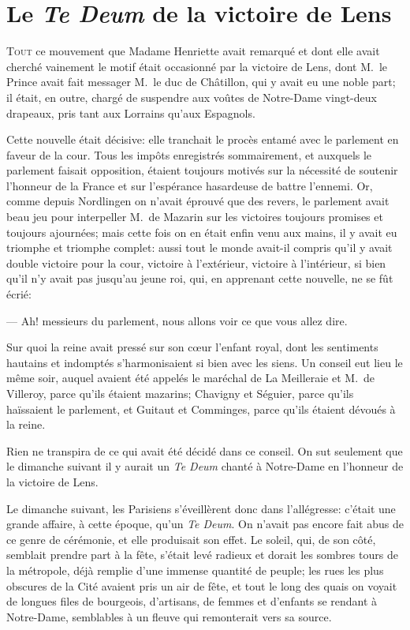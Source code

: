 \chapter{Le \emph{Te Deum} de la victoire de Lens}

\lettrine{T}{out} ce mouvement que Madame Henriette avait remarqué et dont elle avait cherché vainement le motif était occasionné par la victoire de Lens, dont M.~le Prince avait fait messager M.~le duc de Châtillon, qui y avait eu une noble part; il était, en outre, chargé de suspendre aux voûtes de Notre-Dame vingt-deux drapeaux, pris tant aux Lorrains qu'aux Espagnols.

Cette nouvelle était décisive: elle tranchait le procès entamé avec le parlement en faveur de la cour. Tous les impôts enregistrés sommairement, et auxquels le parlement faisait opposition, étaient toujours motivés sur la nécessité de soutenir l'honneur de la France et sur l'espérance hasardeuse de battre l'ennemi. Or, comme depuis Nordlingen on n'avait éprouvé que des revers, le parlement avait beau jeu pour interpeller M.~de Mazarin sur les victoires toujours promises et toujours ajournées; mais cette fois on en était enfin venu aux mains, il y avait eu triomphe et triomphe complet: aussi tout le monde avait-il compris qu'il y avait double victoire pour la cour, victoire à l'extérieur, victoire à l'intérieur, si bien qu'il n'y avait pas jusqu'au jeune roi, qui, en apprenant cette nouvelle, ne se fût écrié:

— Ah! messieurs du parlement, nous allons voir ce que vous allez dire.

Sur quoi la reine avait pressé sur son cœur l'enfant royal, dont les sentiments hautains et indomptés s'harmonisaient si bien avec les siens. Un conseil eut lieu le même soir, auquel avaient été appelés le maréchal de La Meilleraie et M.~de Villeroy, parce qu'ils étaient mazarins; Chavigny et Séguier, parce qu'ils haïssaient le parlement, et Guitaut et Comminges, parce qu'ils étaient dévoués à la reine.

Rien ne transpira de ce qui avait été décidé dans ce conseil. On sut seulement que le dimanche suivant il y aurait un \textit{Te Deum} chanté à Notre-Dame en l'honneur de la victoire de Lens.

Le dimanche suivant, les Parisiens s'éveillèrent donc dans l'allégresse: c'était une grande affaire, à cette époque, qu'un \textit{Te Deum}. On n'avait pas encore fait abus de ce genre de cérémonie, et elle produisait son effet. Le soleil, qui, de son côté, semblait prendre part à la fête, s'était levé radieux et dorait les sombres tours de la métropole, déjà remplie d'une immense quantité de peuple; les rues les plus obscures de la Cité avaient pris un air de fête, et tout le long des quais on voyait de longues files de bourgeois, d'artisans, de femmes et d'enfants se rendant à Notre-Dame, semblables à un fleuve qui remonterait vers sa source.

